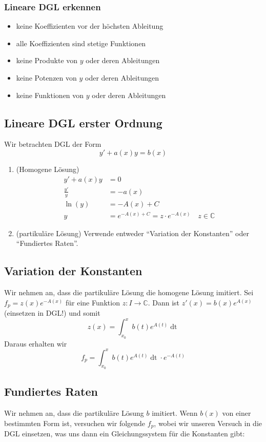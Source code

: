 \documentclass[a4paper,10pt]{article}
\def\C{\mathbb{C}}
\begin{document}
\subsubsection*{Lineare DGL erkennen}
\begin{itemize}
  \item keine Koeffizienten vor der höchsten Ableitung
  \item alle Koeffizienten sind stetige Funktionen
  \item keine Produkte von $y$ oder deren Ableitungen
  \item keine Potenzen von $y$ oder deren Ableitungen
  \item keine Funktionen von $y$ oder deren Ableitungen
\end{itemize}

\subsection{Lineare DGL erster Ordnung}
Wir betrachten DGL der Form \[y' + a(x)y = b(x)\]
\begin{enumerate}
  \item (Homogene Lösung) 
  \begin{align*}
    y' + a(x)y &= 0\\
    \frac{y'}{y} &= -a(x)\\
    \ln(y) &= -A(x)+C\\
    y &= e^{-A(x)+C} = z \cdot e^{-A(x)}\quad z \in \C
  \end{align*}
  \item (partikuläre Lösung) Verwende entweder ``Variation der Konstanten'' oder ``Fundiertes Raten''.
\end{enumerate}
\subsection{Variation der Konstanten}
Wir nehmen an, dass die partikuläre Lösung die homogene Lösung imitiert. Sei \(f_p = z(x)e^{-A(x)}\) für eine Funktion \(z: I \to \C\). Dann ist \(z'(x) = b(x) e^{A(x)}\) (einsetzen in DGL!) und somit \[z(x) = \int_{x_0}^x b(t) e^{A(t)} \mathop{dt}\] Daraus erhalten wir \[f_p = \int_{x_0}^x b(t) e^{A(t)} \mathop{dt} \cdot e^{-A(t)}\]

\subsection{Fundiertes Raten}

Wir nehmen an, dass die partikuläre Lösung $b$ imitiert. Wenn $b(x)$ von einer bestimmten Form ist, versuchen wir folgende $f_p$, wobei wir unseren Versuch in die DGL einsetzen, was uns dann ein Gleichungssystem für die Konstanten gibt:
\end{document}
